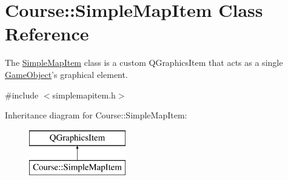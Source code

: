 \hypertarget{classCourse_1_1SimpleMapItem}{\section{Course\-:\-:Simple\-Map\-Item Class Reference}
\label{classCourse_1_1SimpleMapItem}
}


The \hyperlink{classCourse_1_1SimpleMapItem}{Simple\-Map\-Item} class is a custom Q\-Graphics\-Item that acts as a single \hyperlink{classCourse_1_1GameObject}{Game\-Object}'s graphical element.  




{\ttfamily \#include $<$simplemapitem.\-h$>$}

Inheritance diagram for Course\-:\-:Simple\-Map\-Item\-:\begin{figure}[H]
\begin{center}
\leavevmode
\includegraphics[height=2.000000cm]{classCourse_1_1SimpleMapItem}
\end{center}
\end{figure}
